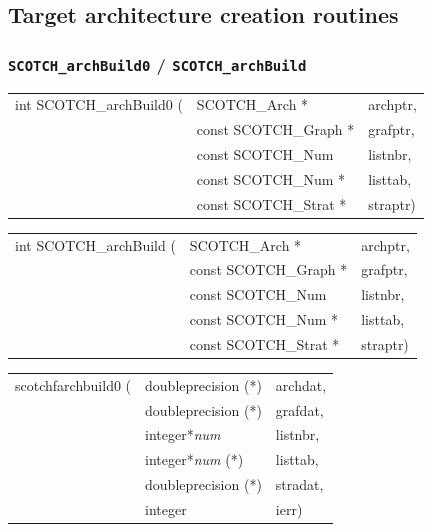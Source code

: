 \subsection{Target architecture creation routines}
\label{sec-lib-arch-create}

\subsubsection{{\tt SCOTCH\_archBuild0} / {\tt SCOTCH\_archBuild}}
\label{sec-lib-arch-build}

\begin{itemize}
\progsyn

{\tt\begin{tabular}{l@{}ll}
int SCOTCH\_archBuild0 ( & SCOTCH\_Arch *        & archptr, \\
                         & const SCOTCH\_Graph * & grafptr, \\
                         & const SCOTCH\_Num     & listnbr, \\
                         & const SCOTCH\_Num *   & listtab, \\
                         & const SCOTCH\_Strat * & straptr) \\
\end{tabular}}

{\tt\begin{tabular}{l@{}ll}
int SCOTCH\_archBuild ( & SCOTCH\_Arch *        & archptr, \\
                        & const SCOTCH\_Graph * & grafptr, \\
                        & const SCOTCH\_Num     & listnbr, \\
                        & const SCOTCH\_Num *   & listtab, \\
                        & const SCOTCH\_Strat * & straptr)
\end{tabular}}

{\tt\begin{tabular}{l@{}ll}
scotchfarchbuild0 ( & doubleprecision (*)   & archdat, \\
                    & doubleprecision (*)   & grafdat, \\
                    & integer*{\it num}     & listnbr, \\
                    & integer*{\it num} (*) & listtab, \\
                    & doubleprecision (*)   & stradat, \\
                    & integer               & ierr)    \\
\end{tabular}}


\end{itemize}
